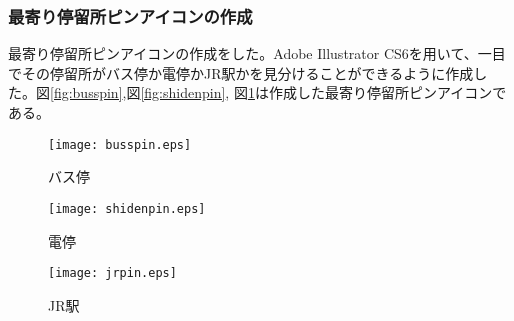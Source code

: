 ﻿\subsubsection{最寄り停留所ピンアイコンの作成}
 最寄り停留所ピンアイコンの作成をした。Adobe Illustrator CS6を用いて、一目でその停留所がバス停か電停かJR駅かを見分けることができるように作成した。図\ref{fig:busspin},図\ref{fig:shidenpin}, 図\ref{fig:jrpin}は作成した最寄り停留所ピンアイコンである。

\begin{figure}[htbp]
 \begin{minipage}{0.3\hsize}
  \begin{center}
   \texttt{[image: busspin.eps]}
  \end{center}
  \caption{バス停}
  \label{fig:busspin}
 \end{minipage}
\begin{minipage}{0.3\hsize}
  \begin{center}
   \texttt{[image: shidenpin.eps]}
  \end{center}
  \caption{電停}
  \label{fig:shidenpin}
 \end{minipage}
\begin{minipage}{0.3\hsize}
  \begin{center}
   \texttt{[image: jrpin.eps]}
  \end{center}
  \caption{JR駅}
  \label{fig:jrpin}
 \end{minipage}
\end{figure}
